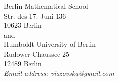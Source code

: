 \documentclass{scrartcl}
\begin{document}
{\footnotesize
\noindent
Berlin Mathematical School\\
Str. des 17. Juni 136\\
10623 Berlin\\
and\\
Humboldt University of Berlin\\
Rudower Chaussee 25\\
12489 Berlin\\
\textit{ Email address: viazovska@gmail.com}}
\end{document}
